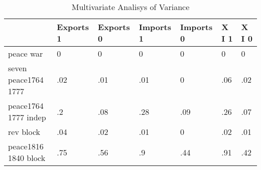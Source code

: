 \begin{table}[htbp]
\caption{\label{manova_test} Multivariate Analisys of Variance}\centering\medskip
\begin{tabular}{|l|l|l|l|l|l|l|}\hline  
 & Exports 1  & Exports 0  & Imports 1  & Imports 0  & X I 1  & X I 0  \\ \hline  
peace war & 0 & 0 & 0 & 0 & 0 & 0 \\ \hline 
seven peace1764 1777 & .02 & .01 & .01 & 0 & .06 & .02 \\ \hline 
peace1764 1777 indep & .2 & .08 & .28 & .09 & .26 & .07 \\ \hline 
rev block & .04 & .02 & .01 & 0 & .02 & .01 \\ \hline 
peace1816 1840 block & .75 & .56 & .9 & .44 & .91 & .42 \\ \hline 
  \end{tabular}
\end{table}
